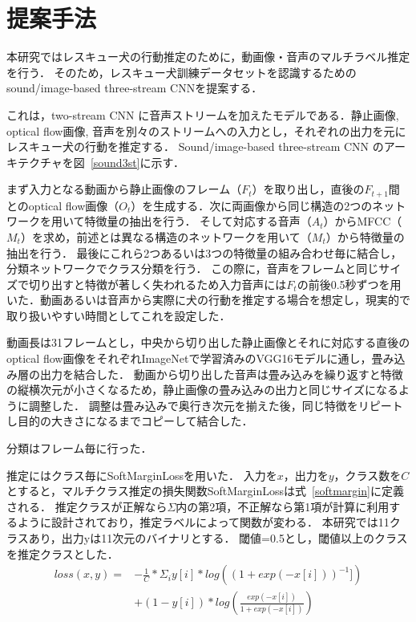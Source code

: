 \documentclass[MIRU,submit]{miru2019j}
\begin{document}
\section{提案手法}
本研究ではレスキュー犬の行動推定のために，動画像・音声のマルチラベル推定を行う．
そのため，レスキュー犬訓練データセットを認識するためのsound/image-based three-stream CNNを提案する．

これは，two-stream CNN に音声ストリームを加えたモデルである．静止画像, optical flow画像, 音声を別々のストリームへの入力とし，それぞれの出力を元にレスキュー犬の行動を推定する．
Sound/image-based three-stream CNN のアーキテクチャを図~\ref{sound3st}に示す．

まず入力となる動画から静止画像のフレーム（$F_t$）を取り出し，直後の$F_{t+1}$間とのoptical flow画像（$O_t$）を生成する．次に両画像から同じ構造の2つのネットワークを用いて特徴量の抽出を行う．
そして対応する音声（$A_t$）からMFCC（$M_t$）を求め，前述とは異なる構造のネットワークを用いて（$M_t$）から特徴量の抽出を行う．
最後にこれら2つあるいは3つの特徴量の組み合わせ毎に結合し，分類ネットワークでクラス分類を行う．
この際に，音声をフレームと同じサイズで切り出すと特徴が著しく失われるため入力音声には$F_t$の前後0.5秒ずつを用いた．動画あるいは音声から実際に犬の行動を推定する場合を想定し，現実的で取り扱いやすい時間としてこれを設定した．

動画長は31フレームとし，中央から切り出した静止画像とそれに対応する直後のoptical flow画像をそれぞれImageNetで学習済みのVGG16モデルに通し，畳み込み層の出力を結合した．
動画から切り出した音声は畳み込みを繰り返すと特徴の縦横次元が小さくなるため，静止画像の畳み込みの出力と同じサイズになるように調整した．
調整は畳み込みで奥行き次元を揃えた後，同じ特徴をリピートし目的の大きさになるまでコピーして結合した．

分類はフレーム毎に行った．

推定にはクラス毎にSoftMarginLossを用いた．
入力を$x$，出力を$y$，クラス数を$C$とすると，マルチクラス推定の損失関数SoftMarginLossは式~\ref{softmargin}に定義される．
推定クラスが正解なら$\Sigma$内の第2項，不正解なら第1項が計算に利用するように設計されており，推定ラベルによって関数が変わる．
本研究では11クラスあり，出力yは11次元のバイナリとする．
閾値=0.5とし，閾値以上のクラスを推定クラスとした．
\begin{equation}
    \label{softmargin}
    \begin{split}
    loss(x, y) = &-\frac{1}{C} * \Sigma_{i} y[i] * log((1+exp(-x[i]))^{-1}])\\
    &+ (1 - y[i]) * log(\frac{exp(-x[i])}{1+exp(-x[i])})
    \end{split}
\end{equation}
\end{document}
